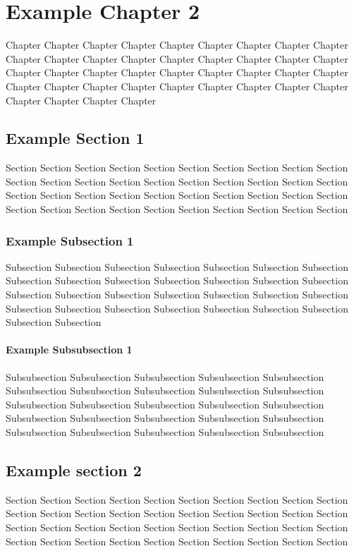 \chapter{Example Chapter 2}

Chapter Chapter Chapter Chapter Chapter Chapter Chapter Chapter
Chapter Chapter Chapter Chapter Chapter Chapter Chapter Chapter
Chapter Chapter Chapter Chapter Chapter Chapter Chapter Chapter
Chapter Chapter Chapter Chapter Chapter Chapter Chapter Chapter
Chapter Chapter Chapter Chapter Chapter Chapter Chapter Chapter

\section{Example Section 1}

Section Section Section Section Section Section Section Section
Section Section Section Section Section Section Section Section
Section Section Section Section Section Section Section Section
Section Section Section Section Section Section Section Section
Section Section Section Section Section Section Section Section

\subsection{Example Subsection 1}

Subsection Subsection Subsection Subsection Subsection Subsection
Subsection Subsection Subsection Subsection Subsection Subsection
Subsection Subsection Subsection Subsection Subsection Subsection
Subsection Subsection Subsection Subsection Subsection Subsection
Subsection Subsection Subsection Subsection Subsection Subsection

\subsubsection{Example Subsubsection 1}

Subsubsection Subsubsection Subsubsection Subsubsection Subsubsection
Subsubsection Subsubsection Subsubsection Subsubsection Subsubsection
Subsubsection Subsubsection Subsubsection Subsubsection Subsubsection
Subsubsection Subsubsection Subsubsection Subsubsection Subsubsection
Subsubsection Subsubsection Subsubsection Subsubsection Subsubsection

\section{Example section 2}

Section Section Section Section Section Section Section Section
Section Section Section Section Section Section Section Section
Section Section Section Section Section Section Section Section
Section Section Section Section Section Section Section Section
Section Section Section Section Section Section Section Section
